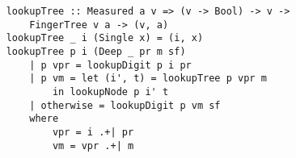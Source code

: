 \begin{verbatim}
    lookupTree :: Measured a v => (v -> Bool) -> v ->
        FingerTree v a -> (v, a)
    lookupTree _ i (Single x) = (i, x)
    lookupTree p i (Deep _ pr m sf)
        | p vpr = lookupDigit p i pr
        | p vm = let (i', t) = lookupTree p vpr m
            in lookupNode p i' t
        | otherwise = lookupDigit p vm sf
        where
            vpr = i .+| pr
            vm = vpr .+| m
\end{verbatim}